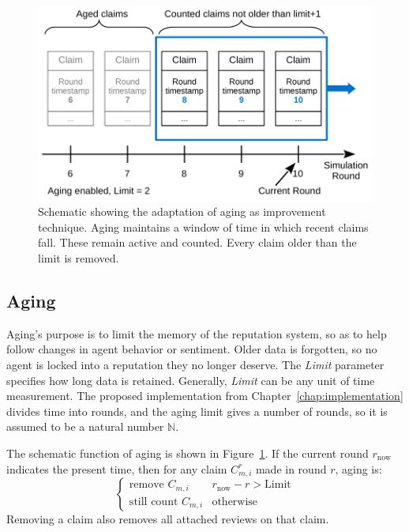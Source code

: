 \documentclass[%
    ]{\PathToTumTemplate/thesis/tum_thesis}
\begin{document}
\begin{figure}[tbp]
  \begin{center}
        \includegraphics[width=0.85\linewidth]	{../images/improvement_aging-crop.pdf}
    \caption{
    Schematic showing the adaptation of aging as improvement technique.
    Aging maintains a window of time in which recent claims fall.
    These remain active and counted.
    Every claim older than the limit is removed.
    }
    \label{fig:improvement_aging}
  \end{center}
\end{figure}

\subsection{Aging}

Aging's purpose is to limit the memory of the reputation system, so as to help follow changes in agent behavior or sentiment.
Older data is forgotten, so no agent is locked into a reputation they no longer deserve.
The \emph{Limit} parameter specifies how long data is retained.
Generally, \emph{Limit} can be any unit of time measurement.
The proposed implementation from Chapter~\ref{chap:implementation} divides time into rounds, and the aging limit gives a number of rounds, so it is assumed to be a natural number $\mathbb{N}$.

The schematic function of aging is shown in Figure~\ref{fig:improvement_aging}.
If the current round $r_{\mathrm{now}}$ indicates the present time, then for any claim $C^r_{m,i}$ made in round $r$, aging is:
\begin{equation}
    \begin{cases}
		\text{remove }C_{m,i} & r_{\mathrm{now}} - r > \mathrm{Limit} \\
		\text{still count }C_{m,i} & \text{otherwise}
    \end{cases}
\end{equation}
Removing a claim also removes all attached reviews on that claim.
\end{document}

